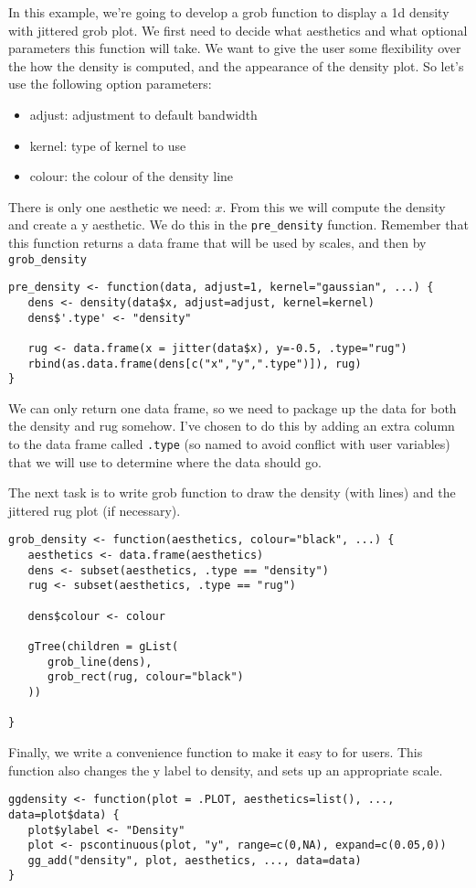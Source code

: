 \documentclass[]{article}
\begin{document}
In this example, we're going to develop a grob function to display a 1d density with jittered grob plot.  We first need to decide what aesthetics and what optional parameters this function will take.  We want to give the user some flexibility over the how the density is computed, and the appearance of the density plot.  So let's use the following option parameters:

\begin{itemize}
	\item adjust: adjustment to default bandwidth
	\item kernel: type of kernel to use
	\item colour: the colour of the density line
\end{itemize}

There is only one aesthetic we need: $x$.  From this we will compute the density and create a y aesthetic.  We do this in the \texttt{pre\_density} function.  Remember that this function returns a data frame that will be used by scales, and then by \texttt{grob\_density}

\begin{verbatim}
pre_density <- function(data, adjust=1, kernel="gaussian", ...) {
   dens <- density(data$x, adjust=adjust, kernel=kernel)
   dens$'.type' <- "density"

   rug <- data.frame(x = jitter(data$x), y=-0.5, .type="rug")
   rbind(as.data.frame(dens[c("x","y",".type")]), rug)
}
\end{verbatim}

We can only return one data frame, so we need to package up the data for both the density and rug somehow.  I've chosen to do this by adding an extra column to the data frame called \texttt{.type} (so named to avoid conflict with user variables) that we will use to determine where the data should go.

The next task is to write grob function to draw the density (with lines) and the jittered rug plot (if necessary).

\begin{verbatim}
grob_density <- function(aesthetics, colour="black", ...) {
   aesthetics <- data.frame(aesthetics)
   dens <- subset(aesthetics, .type == "density")
   rug <- subset(aesthetics, .type == "rug")

   dens$colour <- colour

   gTree(children = gList(
      grob_line(dens),
      grob_rect(rug, colour="black")
   ))

}
\end{verbatim}

Finally, we write a convenience function to make it easy to for users.  This function also changes the y label to density, and sets up an appropriate scale.

\begin{verbatim}
ggdensity <- function(plot = .PLOT, aesthetics=list(), ..., data=plot$data) {
   plot$ylabel <- "Density"
   plot <- pscontinuous(plot, "y", range=c(0,NA), expand=c(0.05,0))
   gg_add("density", plot, aesthetics, ..., data=data)
}  
\end{verbatim}
\end{document}
